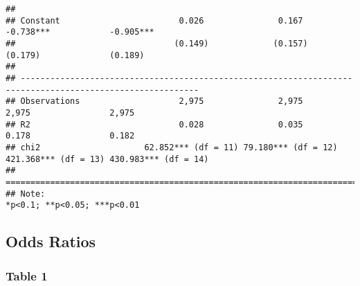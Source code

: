 \documentclass[
]{article}
\begin{document}
\begin{verbatim}
##                                                                                                           
## Constant                        0.026               0.167             -0.738***            -0.905***      
##                                (0.149)             (0.157)             (0.179)              (0.189)       
##                                                                                                           
## ----------------------------------------------------------------------------------------------------------
## Observations                    2,975               2,975               2,975                2,975        
## R2                              0.028               0.035               0.178                0.182        
## chi2                     62.852*** (df = 11) 79.180*** (df = 12) 421.368*** (df = 13) 430.983*** (df = 14)
## ==========================================================================================================
## Note:                                                                          *p<0.1; **p<0.05; ***p<0.01
\end{verbatim}

\hypertarget{odds-ratios}{%
\subsection{Odds Ratios}\label{odds-ratios}}

\hypertarget{table-1-1}{%
\subsubsection{Table 1}\label{table-1-1}}
\end{document}
